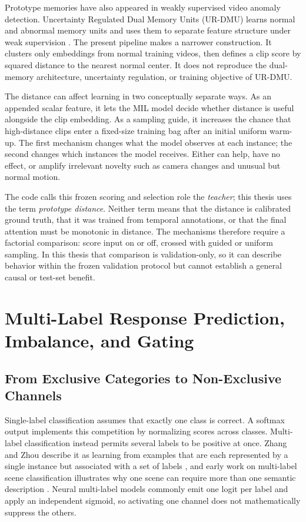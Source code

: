 Prototype memories have also appeared in weakly supervised video anomaly
detection. Uncertainty Regulated Dual Memory Units (UR-DMU) learns normal and
abnormal memory units and uses them to
separate feature structure under weak supervision \cite{zhou2023ur}. The present
pipeline makes a narrower construction. It clusters only embeddings from normal
training videos, then defines a clip score by squared distance to the nearest
normal center. It does not reproduce the dual-memory architecture, uncertainty
regulation, or training objective of UR-DMU.

The distance can affect learning in two conceptually separate ways. As an
appended scalar feature, it lets the MIL model decide whether distance is useful
alongside the clip embedding. As a sampling guide, it increases the chance that
high-distance clips enter a fixed-size training bag after an initial uniform
warm-up. The first mechanism changes what the model observes at each instance;
the second changes which instances the model receives. Either can help, have no
effect, or amplify irrelevant novelty such as camera changes and unusual but
normal motion.

The code calls this frozen scoring and selection role the \emph{teacher};
this thesis uses the term \emph{prototype distance}. Neither term means that the distance is calibrated ground truth,
that it was trained from temporal annotations, or that the final attention must
be monotonic in distance. The mechanisms therefore require a factorial
comparison: score input on or off, crossed with guided or uniform sampling. In
this thesis that comparison is validation-only, so it can describe behavior
within the frozen validation protocol but cannot establish a general causal or
test-set benefit.

\section{Multi-Label Response Prediction, Imbalance, and Gating}
\label{sec:background-response}

\subsection{From Exclusive Categories to Non-Exclusive Channels}

Single-label classification assumes that exactly one class is correct. A
softmax output implements this competition by normalizing scores across classes.
Multi-label classification instead permits several labels to be positive at
once. Zhang and Zhou describe it as learning from examples that are each
represented by a single instance but associated with a set of labels
\cite{zhang2014review}, and early work on multi-label scene classification
illustrates why one scene can require more than one semantic description
\cite{boutell2004learning}. Neural multi-label models commonly emit one logit per
label and apply an independent sigmoid, so activating one channel does not
mathematically suppress the others.

